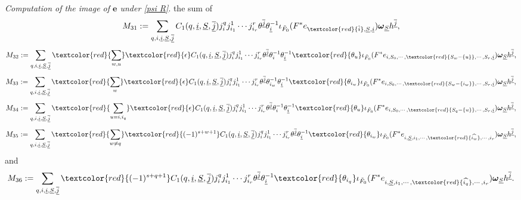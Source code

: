 \documentclass[12pt, a4paper]{article}
\begin{document}
\emph{Computation of the image of $\boldsymbol{e}$ under \eqref{psi R}}.
\iffalse
the sum of
$$
M_{31}:=\sum_{q,i,\underline i,\underline S,\underline{\overline j}} C_1(q,\underline i,\underline S,\underline{\overline j})j^q_ij^1_{i_1}\cdots j^r_{i_r}\theta^{\underline{\overline j}}\theta_{\underline i}^{-1}\iota_{\tilde F_0}(F^*e_{\textcolor{red}{\hat i},\underline S,\underline i})\boldsymbol{\omega}_{\underline S}h^{\underline{\overline j}},
$$
$$
M_{32}:=\sum_{q,i,\underline i,\underline S,\underline{\overline j}}\textcolor{red}{\sum_{w,u}}\textcolor{red}{\epsilon}C_1(q,\underline i,\underline S,\underline{\overline j})j^q_ij^1_{i_1}\cdots j^r_{i_r}\theta^{\underline{\overline j}}\theta_i^{-1}\theta_{\underline i}^{-1}\textcolor{red}{\theta_u}\iota_{\tilde F_0}(F^*e_{i,S_0,\cdots,\textcolor{red}{S_w-\{u\}},\cdots,S_r,\underline i})\boldsymbol{\omega}_{\underline S}h^{\underline{\overline j}},
$$
$$
M_{33}:=\sum_{q,i,\underline i,\underline S,\underline{\overline j}}\textcolor{red}{\sum_w}\textcolor{red}{\epsilon}C_1(q,\underline i,\underline S,\underline{\overline j})j^q_ij^1_{i_1}\cdots j^r_{i_r}\theta^{\underline{\overline j}}\theta_{i_w}^{-1}\theta_{\underline i}^{-1}\textcolor{red}{\theta_{i_w}}\iota_{\tilde F_0}(F^*e_{i,S_0,\cdots,\textcolor{red}{S_w-\{i_w\}},\cdots,S_r,\underline i})\boldsymbol{\omega}_{\underline S}h^{\underline{\overline j}},
$$
$$
M_{34}:=\sum_{q,i,\underline i,\underline S,\underline{\overline j}}\textcolor{red}{\sum_{u=i,i_q}}\textcolor{red}{\epsilon}C_1(q,\underline i,\underline S,\underline{\overline j})j^q_ij^1_{i_1}\cdots j^r_{i_r}\theta^{\underline{\overline j}}\theta_i^{-1}\theta_{\underline i}^{-1}\textcolor{red}{\theta_u}\iota_{\tilde F_0}(F^*e_{i,S_0,\cdots,\textcolor{red}{S_q-\{u\}},\cdots,S_r,\underline i})\boldsymbol{\omega}_{\underline S}h^{\underline{\overline j}},
$$
$$
M_{35}:=\sum_{q,i,\underline i,\underline S,\underline{\overline j}}\textcolor{red}{\sum_{w\neq q}}\textcolor{red}{(-1)^{s+w+1}}C_1(q,\underline i,\underline S,\underline{\overline j})j^q_ij^1_{i_1}\cdots j^r_{i_r}\theta^{\underline{\overline j}}\theta_{\underline i}^{-1}\textcolor{red}{\theta_{i_w}}\iota_{\tilde F_0}(F^*e_{i,\underline S,i_1,\cdots,\textcolor{red}{\widehat{i_w}},\cdots,i_r})\boldsymbol{\omega}_{\underline S}h^{\underline{\overline j}},
$$
and
$$
M_{36}:=\sum_{q,i,\underline i,\underline S,\underline{\overline j}}\textcolor{red}{(-1)^{s+q+1}}C_1(q,\underline i,\underline S,\underline{\overline j})j^q_ij^1_{i_1}\cdots j^r_{i_r}\theta^{\underline{\overline j}}\theta_{\underline i}^{-1}\textcolor{red}{\theta_{i_q}}\iota_{\tilde F_0}(F^*e_{i,\underline S,i_1,\cdots,\textcolor{red}{\widehat{i_q}},\cdots,i_r})\boldsymbol{\omega}_{\underline S}h^{\underline{\overline j}}.
$$
\end{document}
